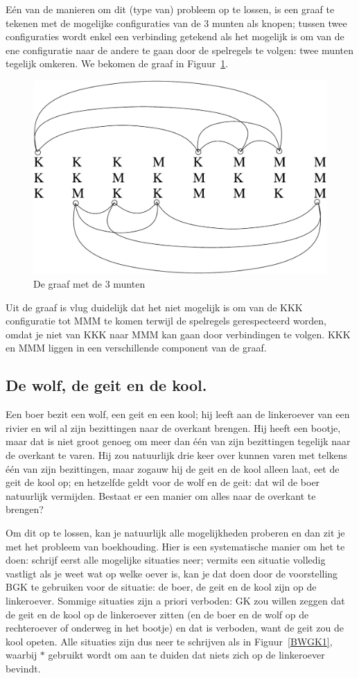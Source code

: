E\'{e}n van de manieren om dit (type van) probleem op te lossen, is een
graaf te tekenen met de mogelijke configuraties van de 3 munten als
knopen; tussen twee configuraties wordt enkel een verbinding getekend
als het mogelijk is om van de ene configuratie naar de andere te gaan
door de spelregels te volgen: twee munten tegelijk omkeren. We bekomen de
graaf in Figuur~\ref{munten}.

\begin{figure}[ht]
\begin{center}
\includegraphics[width=0.5\linewidth,keepaspectratio]{munten}
\end{center}
\caption{De graaf met de 3 munten \label{munten}}
\end{figure}

Uit de graaf is vlug duidelijk dat het niet mogelijk is om van de KKK
configuratie tot MMM te komen terwijl de spelregels gerespecteerd
worden, omdat je niet van KKK naar MMM kan gaan door verbindingen te
volgen. KKK en MMM liggen in een verschillende component van de graaf.


\subsection{De wolf, de geit en de kool.}

Een boer bezit een wolf, een geit en een kool; hij leeft aan de
linkeroever van een rivier en wil al zijn bezittingen naar de overkant
brengen. Hij heeft een bootje, maar dat is niet groot genoeg om meer
dan \'{e}\'{e}n van zijn bezittingen tegelijk naar de overkant te
varen. Hij zou natuurlijk drie keer over kunnen varen met telkens
\'{e}\'{e}n van zijn bezittingen, maar zogauw hij de geit en de kool
alleen laat, eet de geit de kool op; en hetzelfde geldt voor de wolf
en de geit: dat wil de boer natuurlijk vermijden. Bestaat er een
manier om alles naar de overkant te brengen?

Om dit op te lossen, kan je natuurlijk alle mogelijkheden
proberen en dan zit je met het probleem van boekhouding. Hier is een
systematische manier om het te doen: schrijf eerst alle mogelijke
situaties neer; vermits een situatie volledig vastligt als je weet wat
op welke oever is, kan je dat doen door de voorstelling BGK te
gebruiken voor de situatie: de boer, de geit en de kool zijn op de
linkeroever. Sommige situaties zijn a priori verboden: GK zou willen
zeggen dat de geit en de kool op de linkeroever zitten (en de boer en
de wolf op de rechteroever of onderweg in het bootje) en dat is
verboden, want de geit zou de kool opeten. Alle situaties zijn dus
neer te schrijven als in Figuur~\ref{BWGK1}, waarbij $\ast$
gebruikt wordt om aan te duiden dat niets zich op de linkeroever
bevindt.

